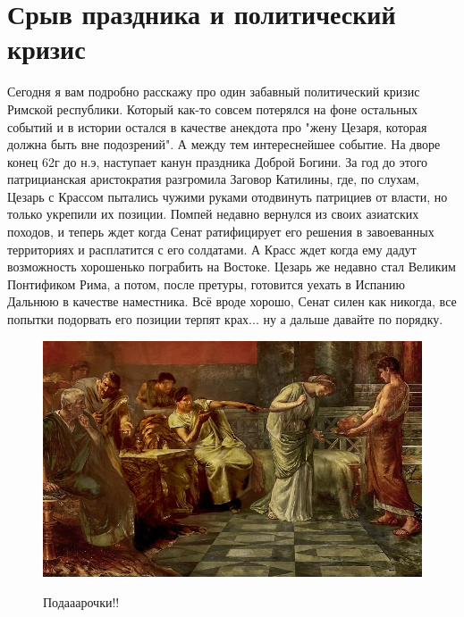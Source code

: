 \chapter{Срыв праздника и политический кризис}

Сегодня я вам подробно расскажу про один забавный политический кризис Римской республики. Который как-то совсем потерялся на фоне остальных событий и в истории остался в качестве анекдота про "жену Цезаря, которая должна быть вне подозрений". А между тем интереснейшее событие. На дворе конец 62г до н.э, наступает канун праздника Доброй Богини. За год до этого патрицианская аристократия разгромила Заговор Катилины, где, по слухам, Цезарь с Крассом пытались чужими руками отодвинуть патрициев от власти, но только укрепили их позиции. Помпей недавно вернулся из своих азиатских походов, и теперь ждет когда Сенат ратифицирует его решения в завоеванных территориях и расплатится с его солдатами. А Красс ждет когда ему дадут возможность хорошенько пограбить на Востоке. Цезарь же недавно стал Великим Понтификом Рима, а потом, после претуры, готовится уехать в Испанию Дальнюю в качестве наместника. Всё вроде хорошо, Сенат силен как никогда, все попытки подорвать его позиции терпят крах... ну а дальше давайте по порядку.

\begin{figure}[h!tb]
	\centering\includegraphics[scale=0.5]{holiday/1593524621164876195.png}
	\label{fig:holid1} %
	\caption{Подааарочки!!	}
\end{figure}

